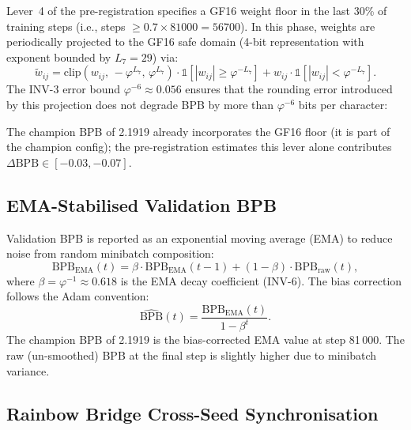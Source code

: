 Lever~4 of the pre-registration \cite{trios_gate_preregistration} specifies a
GF16 weight floor in the last 30\% of training steps (i.e., steps
$\geq 0.7 \times 81000 = 56700$).  In this phase, weights are periodically
projected to the GF16 safe domain (4-bit representation with exponent bounded
by $L_7 = 29$) via:
\begin{equation}\label{eq:ch24-gf16-floor}
  \tilde{w}_{ij} = \mathrm{clip}(w_{ij},\,-\varphi^{L_7},\,\varphi^{L_7})
                  \cdot \mathbb{1}[|w_{ij}| \geq \varphi^{-L_7}]
                  + w_{ij} \cdot \mathbb{1}[|w_{ij}| < \varphi^{-L_7}].
\end{equation}
The INV-3 error bound $\varphi^{-6} \approx 0.056$ ensures that the rounding
error introduced by this projection does not degrade BPB by more than
$\varphi^{-6}$ bits per character:

The champion BPB of 2.1919 already incorporates the GF16 floor (it is part of
the champion config); the pre-registration estimates this lever alone contributes
$\Delta\mathrm{BPB} \in [-0.03, -0.07]$.

\subsection{EMA-Stabilised Validation BPB}
\label{subsec:ch24-ema-bpb}

Validation BPB is reported as an exponential moving average (EMA) to reduce
noise from random minibatch composition:
\begin{equation}\label{eq:ch24-ema-bpb}
  \mathrm{BPB}_{\mathrm{EMA}}(t) = \beta \cdot \mathrm{BPB}_{\mathrm{EMA}}(t-1)
    + (1 - \beta) \cdot \mathrm{BPB}_{\mathrm{raw}}(t),
\end{equation}
where $\beta = \varphi^{-1} \approx 0.618$ is the EMA decay coefficient
(INV-6).  The bias correction follows the Adam convention:
\begin{equation}\label{eq:ch24-ema-bias}
  \hat{\mathrm{BPB}}(t) = \frac{\mathrm{BPB}_{\mathrm{EMA}}(t)}{1 - \beta^t}.
\end{equation}
The champion BPB of 2.1919 is the bias-corrected EMA value at step 81\,000.
The raw (un-smoothed) BPB at the final step is slightly higher due to
minibatch variance.

\subsection{Rainbow Bridge Cross-Seed Synchronisation}
\label{subsec:ch24-rainbow-bridge}

